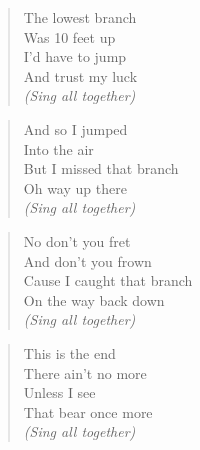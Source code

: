 \begin{verse}
The lowest branch \\
Was 10 feet up \\
I'd have to jump \\
And trust my luck \\
\textit{(Sing all together)} \\
\end{verse}

\begin{verse}
And so I jumped \\
Into the air \\
But I missed that branch \\
Oh way up there \\
\textit{(Sing all together)} \\
\end{verse}

\begin{verse}
No don't you fret \\
And don't you frown \\
Cause I caught that branch \\
On the way back down \\
\textit{(Sing all together)} \\
\end{verse}

\begin{verse}
This is the end \\
There ain't no more \\
Unless I see \\
That bear once more \\
\textit{(Sing all together)} \\
\end{verse}
